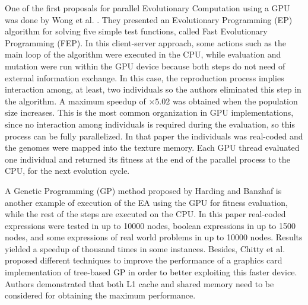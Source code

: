 \documentclass{article}
\begin{document}
One of the first proposals for parallel Evolutionary Computation using
a GPU was done by Wong et
al. \cite{man-leung-wong-parallel-2005}. They presented an
Evolutionary Programming (EP) algorithm
for solving five simple test functions, called Fast Evolutionary Programming
(FEP). In this client-server approach, some actions such as the main loop of the algorithm were executed in the CPU, while evaluation and mutation were run within the GPU device because both steps do not need of external information exchange. In this case, the reproduction process implies interaction among, at least, two individuals so the authors eliminated this step in the algorithm. A maximum speedup of $\times5.02$ was obtained when the population size increases. This is the most common organization in GPU implementations, since no
interaction among individuals is required during the evaluation, so
this process can be fully parallelized. In that paper the individuals
was real-coded and the genomes were mapped into the texture
memory. Each GPU thread evaluated one individual and returned its
fitness at the end of the parallel process to the CPU, for the next
evolution cycle.

A Genetic Programming (GP) method proposed by Harding and Banzhaf \cite{4215552} is another example of execution of the EA using the GPU for fitness evaluation, while the rest of the steps are executed on the CPU. In this paper real-coded expressions were tested in up to 10000 nodes, boolean expressions in up to 1500 nodes, and some expressions of real world problems in up to 10000 nodes. Results yielded a speedup of thousand times in some instances.
Besides, Chitty et al. \cite{Chitty2016} proposed different techniques to improve the performance of a graphics card implementation of tree-based GP in order to better exploiting this faster device. Authors demonstrated that both L1 cache and shared memory need to be considered for obtaining the maximum performance.
\end{document}

